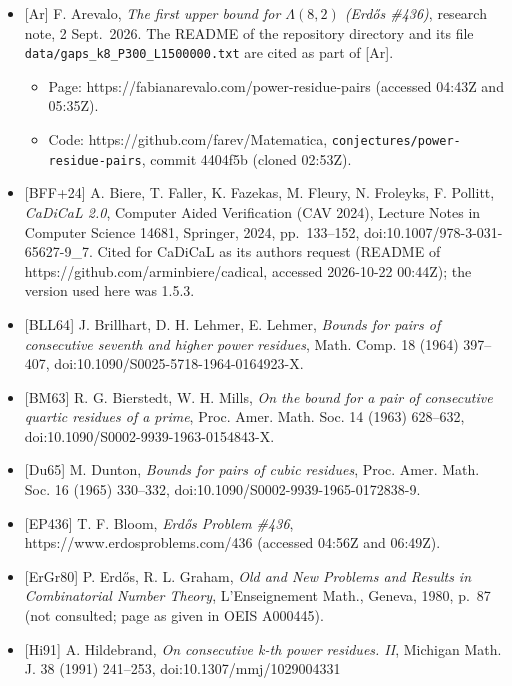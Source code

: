 \documentclass[
]{amsart}
\providecommand{\tightlist}{%
  \setlength{\itemsep}{0pt}\setlength{\parskip}{0pt}}
\begin{document}
\begin{itemize}
\tightlist
\item
  {[}Ar{]} F. Arevalo, \emph{The first upper bound for \(\Lambda(8,2)\)
  (Erdős \#436)}, research note, 2 Sept.~2026. The README of the
  repository directory and its file
  \texttt{data/gaps\_k8\_P300\_L1500000.txt} are cited as part of
  {[}Ar{]}.

  \begin{itemize}
  \tightlist
  \item
    Page: https://fabianarevalo.com/power-residue-pairs (accessed 04:43Z
    and 05:35Z).
  \item
    Code: https://github.com/farev/Matematica,
    \texttt{conjectures/power-residue-pairs}, commit 4404f5b (cloned
    02:53Z).
  \end{itemize}
\item
  {[}BFF+24{]} A. Biere, T. Faller, K. Fazekas, M. Fleury, N. Froleyks,
  F. Pollitt, \emph{CaDiCaL 2.0}, Computer Aided Verification (CAV
  2024), Lecture Notes in Computer Science 14681, Springer, 2024,
  pp.~133--152, doi:10.1007/978-3-031-65627-9\_7. Cited for CaDiCaL as
  its authors request (README of https://github.com/arminbiere/cadical,
  accessed 2026-10-22 00:44Z); the version used here was 1.5.3.
\item
  {[}BLL64{]} J. Brillhart, D. H. Lehmer, E. Lehmer, \emph{Bounds for
  pairs of consecutive seventh and higher power residues}, Math. Comp.
  18 (1964) 397--407, doi:10.1090/S0025-5718-1964-0164923-X.
\item
  {[}BM63{]} R. G. Bierstedt, W. H. Mills, \emph{On the bound for a pair
  of consecutive quartic residues of a prime}, Proc. Amer. Math. Soc. 14
  (1963) 628--632, doi:10.1090/S0002-9939-1963-0154843-X.
\item
  {[}Du65{]} M. Dunton, \emph{Bounds for pairs of cubic residues}, Proc.
  Amer. Math. Soc. 16 (1965) 330--332,
  doi:10.1090/S0002-9939-1965-0172838-9.
\item
  {[}EP436{]} T. F. Bloom, \emph{Erdős Problem \#436},
  https://www.erdosproblems.com/436 (accessed 04:56Z and 06:49Z).
\item
  {[}ErGr80{]} P. Erdős, R. L. Graham, \emph{Old and New Problems and
  Results in Combinatorial Number Theory}, L'Enseignement Math., Geneva,
  1980, p.~87 (not consulted; page as given in OEIS A000445).
\item
  {[}Hi91{]} A. Hildebrand, \emph{On consecutive k-th power residues.
  II}, Michigan Math. J. 38 (1991) 241--253, doi:10.1307/mmj/1029004331

\end{itemize}
\end{document}
